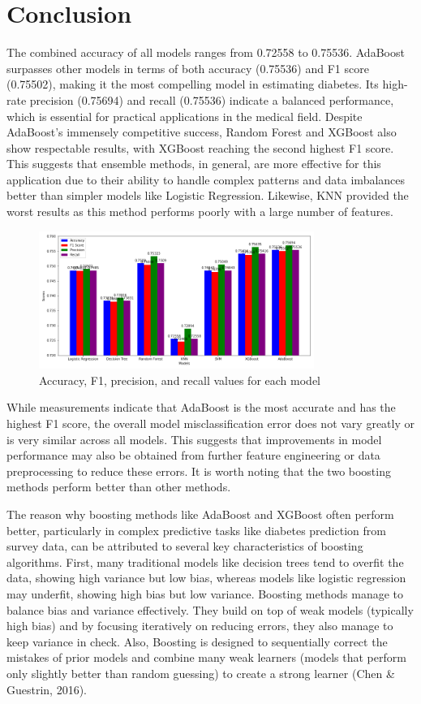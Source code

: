\documentclass[]{article}
\begin{document}
\section{Conclusion}
The combined accuracy of all models ranges from 0.72558 to 0.75536. AdaBoost surpasses other models in terms of both accuracy (0.75536) and F1 score (0.75502), making it the most compelling model in estimating diabetes. Its high-rate precision (0.75694) and recall (0.75536) indicate a balanced performance, which is essential for practical applications in the medical field. Despite AdaBoost's immensely competitive success, Random Forest and XGBoost also show respectable results, with XGBoost reaching the second highest F1 score. This suggests that ensemble methods, in general, are more effective for this application due to their ability to handle complex patterns and data imbalances better than simpler models like Logistic Regression. Likewise, KNN provided the worst results as this method performs poorly with a large number of features.
\begin{figure}[h]
  \centering
  \includegraphics[width=0.8\textwidth]{combined.png}
  \caption{Accuracy, F1, precision, and recall values for each model}
  \label{fig:bar}
\end{figure}
While measurements indicate that AdaBoost is the most accurate and has the highest F1 score, the overall model misclassification error does not vary greatly or is very similar across all models. This suggests that improvements in model performance may also be obtained from further feature engineering or data preprocessing to reduce these errors. It is worth noting that the two boosting methods perform better than other methods. 

The reason why boosting methods like AdaBoost and XGBoost often perform better, particularly in complex predictive tasks like diabetes prediction from survey data, can be attributed to several key characteristics of boosting algorithms. First, many traditional models like decision trees tend to overfit the data, showing high variance but low bias, whereas models like logistic regression may underfit, showing high bias but low variance. Boosting methods manage to balance bias and variance effectively. They build on top of weak models (typically high bias) and by focusing iteratively on reducing errors, they also manage to keep variance in check. Also, Boosting is designed to sequentially correct the mistakes of prior models and combine many weak learners (models that perform only slightly better than random guessing) to create a strong learner (Chen \& Guestrin, 2016).
\end{document}
